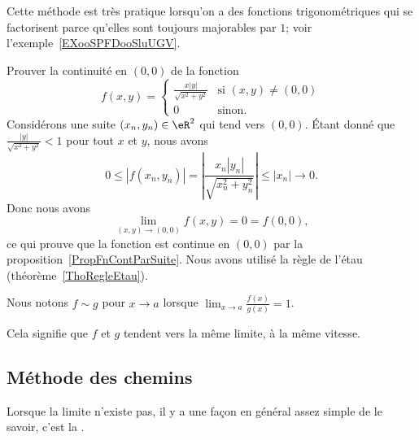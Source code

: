 Cette méthode est très pratique lorsqu'on a des fonctions trigonométriques qui se factorisent parce qu'elles sont toujours majorables par \( 1\); voir l'exemple~\ref{EXooSPFDooSluUGV}.

\begin{example}
	Prouver la continuité en \( (0,0)\) de la fonction
	\begin{equation}
		f(x,y)=\begin{cases}
			\frac{ x | y | }{ \sqrt{x^2+y^2} } & \text{si }(x,y)\neq (0,0) \\
			0                                  & \text{sinon.}
		\end{cases}
	\end{equation}
	Considérons une suite \( (x_n,y_n)\in\eR^2\) qui tend vers \( (0,0)\). Étant donné que \( \frac{ | y | }{ \sqrt{x^2+y^2} }<1\) pour tout \( x\) et \( y\), nous avons
	\begin{equation}
		0\leq | f(x_n,y_n) |=\left| \frac{ x_n | y_n | }{ \sqrt{x_n^2+y_n^2} } \right| \leq | x_n |\to 0.
	\end{equation}
	Donc nous avons
	\begin{equation}
		\lim_{(x,y)\to(0,0)}f(x,y)=0=f(0,0),
	\end{equation}
	ce qui prouve que la fonction est continue en \( (0,0)\) par la proposition~\ref{PropFnContParSuite}. Nous avons utilisé la règle de l'étau (théorème~\ref{ThoRegleEtau}).
\end{example}

\begin{normaltext}
	Nous notons \( f\sim g\) pour \( x\to a\) lorsque \( \lim_{x\to a} \frac{ f(x) }{ g(x) }=1\).

	Cela signifie que \( f\) et \( g\) tendent vers la même limite, à la même vitesse.
\end{normaltext}

\subsection{Méthode des chemins}

Lorsque la limite n'existe pas, il y a une façon en général assez simple de le savoir, c'est la .

